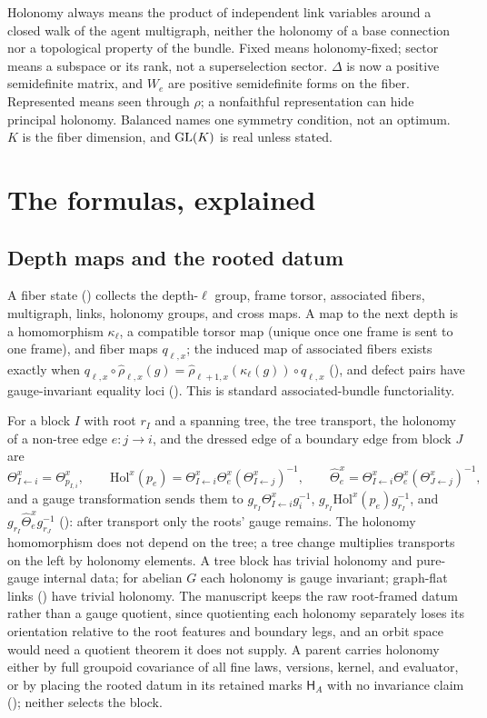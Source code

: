 Holonomy always means the product of independent link variables around a closed walk of the agent
multigraph, neither the holonomy of a base connection nor a topological property of the bundle. Fixed
means holonomy-fixed; sector means a subspace or its rank, not a superselection sector. $\Delta$ is now
a positive semidefinite matrix, and $W_e$ are positive semidefinite forms on the fiber. Represented means
seen through $\rho$; a nonfaithful representation can hide principal holonomy. Balanced names one
symmetry condition, not an optimum. $K$ is the fiber dimension, and $\mathrm{GL}(K)$ is real unless stated.

\section{The formulas, explained}
\label{comp:ch10-formulas}

\subsection{Depth maps and the rooted datum}

A fiber state () collects the depth-$\ell$ group, frame torsor, associated
fibers, multigraph, links, holonomy groups, and cross maps. A map to the next depth is a homomorphism
$\kappa_\ell$, a compatible torsor map (unique once one frame is sent to one frame), and fiber maps
$q_{\ell,x}$; the induced map of associated fibers exists exactly when
$q_{\ell,x}\circ\widehat\rho_{\ell,x}(g)=\widehat\rho_{\ell+1,x}(\kappa_\ell(g))\circ q_{\ell,x}$
(), and defect pairs have gauge-invariant equality loci
(). This is standard associated-bundle functoriality.

For a block $I$ with root $r_I$ and a spanning tree, the tree transport, the holonomy of a non-tree edge
$e:j\to i$, and the dressed edge of a boundary edge from block $J$ are
\[
\Theta^x_{I\leftarrow i}=\Theta^x_{p_{I,i}},
\qquad
\mathrm{Hol}^x(p_e)=\Theta^x_{I\leftarrow i}\Theta^x_e(\Theta^x_{I\leftarrow j})^{-1},
\qquad
\widehat\Theta^x_e=\Theta^x_{I\leftarrow i}\Theta^x_e(\Theta^x_{J\leftarrow j})^{-1},
\]
and a gauge transformation sends them to $g_{r_I}\Theta^x_{I\leftarrow i}g_i^{-1}$,
$g_{r_I}\mathrm{Hol}^x(p_e)g_{r_I}^{-1}$, and $g_{r_I}\widehat\Theta^x_eg_{r_J}^{-1}$
(): after transport only the roots' gauge remains. The holonomy homomorphism
does not depend on the tree; a tree change multiplies transports on the left by holonomy elements. A
tree block has trivial holonomy and pure-gauge internal data; for abelian $G$ each holonomy is gauge
invariant; graph-flat links () have trivial holonomy. The manuscript
keeps the raw root-framed datum rather than a gauge quotient, since quotienting each holonomy separately
loses its orientation relative to the root features and boundary legs, and an orbit space would need a
quotient theorem it does not supply. A parent carries holonomy either by full groupoid covariance of all
fine laws, versions, kernel, and evaluator, or by placing the rooted datum in its retained marks
$\mathsf H_A$ with no invariance claim (); neither selects the
block.

